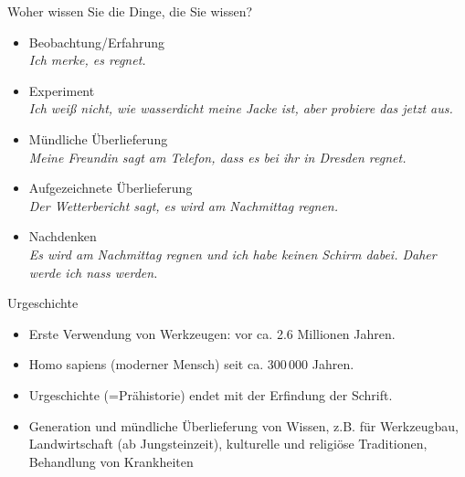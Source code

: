 \documentclass{beamer}
\begin{document}
\begin{frame}{Woher wissen Sie die Dinge, die Sie wissen?}


\begin{itemize}
    \item 
Beobachtung/Erfahrung \\
\textit{Ich merke, es regnet.}
\item 
Experiment \\
\textit{Ich weiß nicht, wie wasserdicht meine Jacke ist, aber probiere das jetzt aus.}
\item 
Mündliche Überlieferung \\
\textit{Meine Freundin sagt am Telefon, dass es bei ihr in Dresden regnet.}
\item
Aufgezeichnete Überlieferung \\
\textit{Der Wetterbericht sagt, es wird am Nachmittag regnen.}
\item 
Nachdenken \\
\textit{Es wird am Nachmittag regnen und ich habe keinen Schirm dabei. Daher werde ich nass werden.}

\end{itemize}

\end{frame}



\begin{frame}{Urgeschichte}



\begin{itemize}
    \item 
    Erste Verwendung von Werkzeugen: vor ca. 2.6 Millionen Jahren. 
\item 
Homo sapiens (moderner Mensch) seit ca. 300\,000 Jahren.
\item 
Urgeschichte (=Prähistorie) endet mit der Erfindung der Schrift. 
\item 
Generation und mündliche Überlieferung von Wissen, z.B. für Werkzeugbau, Landwirtschaft (ab Jungsteinzeit), kulturelle und religiöse Traditionen, Behandlung von Krankheiten
\end{itemize}

\end{frame}
\end{document}
